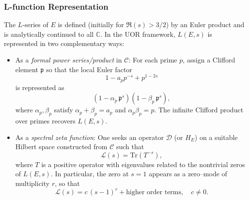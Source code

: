 \documentclass[11pt]{article}
\begin{document}
\subsubsection*{L-function Representation}
The $L$-series of $E$ is defined (initially for $\Re(s)>3/2$) by an Euler product and is analytically continued to all $\mathbb{C}$. In the UOR framework, $L(E,s)$ is represented in two complementary ways:
\begin{itemize}[leftmargin=2em]
  \item As a \emph{formal power series/product} in $\mathcal{C}$: For each prime $p$, assign a Clifford element $\mathfrak{p}$ so that the local Euler factor
  \[
  1 - a_p p^{-s} + p^{1-2s}
  \]
  is represented as 
  \[
  (1-\alpha_p\,\mathfrak{p}^s)(1-\beta_p\,\mathfrak{p}^s),
  \]
  where $\alpha_p,\beta_p$ satisfy $\alpha_p+\beta_p=a_p$ and $\alpha_p\beta_p=p$. The infinite Clifford product over primes recovers $L(E,s)$.
  
  \item As a \emph{spectral zeta function}: One seeks an operator $\mathcal{D}$ (or $H_E$) on a suitable Hilbert space constructed from $\mathcal{C}$ such that
  \[
  \mathcal{L}(s) = \mathrm{Tr}(T^{-s}),
  \]
  where $T$ is a positive operator with eigenvalues related to the nontrivial zeros of $L(E,s)$. In particular, the zero at $s=1$ appears as a zero--mode of multiplicity $r$, so that
  \[
  \mathcal{L}(s)= c\,(s-1)^r + \text{higher order terms},\quad c\neq 0.
  \]
\end{itemize}
\end{document}
